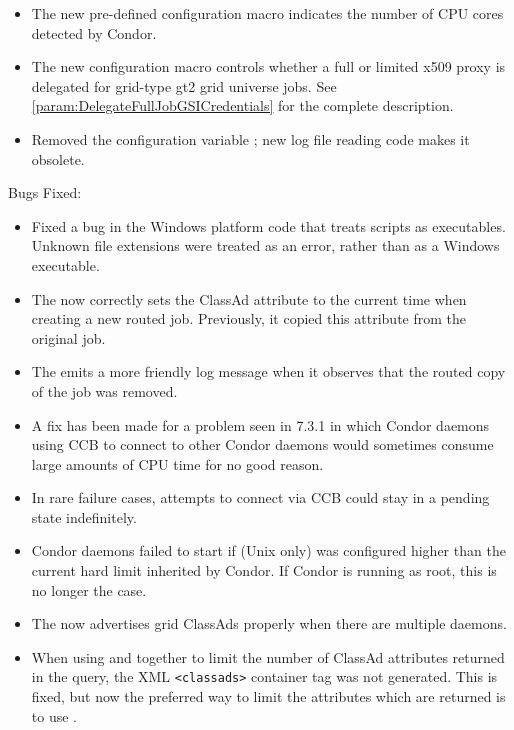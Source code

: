 \begin{itemize}
\item The new pre-defined configuration macro 
indicates the number of CPU cores detected by Condor.

\item The new configuration macro 
controls whether a full or limited x509 proxy is delegated for grid-type
gt2 grid universe jobs. See \ref{param:DelegateFullJobGSICredentials}
for the complete description.

\item Removed the configuration variable
; new log file reading code makes it
obsolete.

\end{itemize}

\noindent Bugs Fixed:

\begin{itemize}

\item Fixed a bug in the Windows platform code that treats scripts as
  executables.
  Unknown file extensions were treated as an error,
  rather than as a Windows executable.

\item The  now correctly sets the ClassAd attribute
 to the current time when creating a new routed job.
Previously, it copied this attribute from the original job.

\item The  emits a more friendly log message when it
observes that the routed copy of the job was removed.

\item A fix has been made for a problem seen in 7.3.1 in which Condor daemons
using CCB to connect to other Condor daemons would sometimes consume
large amounts of CPU time for no good reason.

\item In rare failure cases, attempts to connect via CCB could stay in
a pending state indefinitely.

\item Condor daemons failed to start if
 (Unix only) was configured higher
than the current hard limit inherited by Condor.  If Condor is running
as root, this is no longer the case.

\item The  now advertises grid ClassAds properly when there
are multiple  daemons.

\item When using   and  together to
limit the number of ClassAd attributes returned in the query, the XML
\verb|<classads>| container tag was not generated.  This is fixed, but
now the preferred way to limit the attributes which are returned is to
use  .

\end{itemize}

